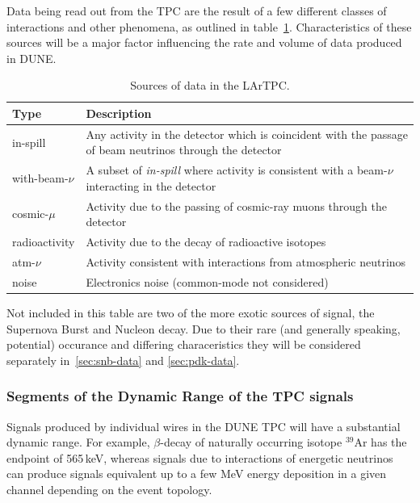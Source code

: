 Data being read out from the TPC are the result of a few different classes of interactions and other phenomena,
as outlined in table~\ref{tab:dune-data-sources}. Characteristics of these sources will
be a major factor influencing the rate and volume of data produced in DUNE.
\begin{table}[ht!]
	\centering
	\begin{tabular}{| p{1in} | p{4.5in} |}
		\hline
	\textbf{Type} & \textbf{Description} \\ \hline
		
	in-spill & Any activity in the detector which is coincident with
	the passage of beam neutrinos through the detector \\ \hline
	
	with-beam-$\nu$ & A subset of \textit{in-spill} where activity is
	consistent with a beam-$\nu$ interacting in the detector \\ \hline
	
	cosmic-$\mu$ & Activity due to the passing of cosmic-ray muons
	through the detector \\ \hline
	
	radioactivity & Activity due to the decay of radioactive
	isotopes \\ \hline
	
	atm-$\nu$ & Activity consistent with interactions from
	atmospheric neutrinos \\ \hline
	
	noise & Electronics noise (common-mode not considered) \\ \hline

	\end{tabular}
	\caption{Sources of data in the LArTPC.}
	\label{tab:dune-data-sources}
\end{table}

Not included in this table are two of the more exotic sources of signal, the Supernova Burst and Nucleon decay.
Due to their rare (and generally speaking, potential) occurance and differing characeristics they will be considered separately
in~\ref{sec:snb-data} and \ref{sec:pdk-data}.

\subsubsection{Segments of the Dynamic Range of the TPC signals}

Signals produced by individual wires in the DUNE TPC will have a substantial
dynamic range. For example, $\beta$-decay of naturally occurring isotope $^{39}$Ar has the endpoint of
565\,keV, whereas signals due to interactions of energetic neutrinos can produce signals
equivalent up to a few MeV energy deposition in a given channel depending on the event topology.

